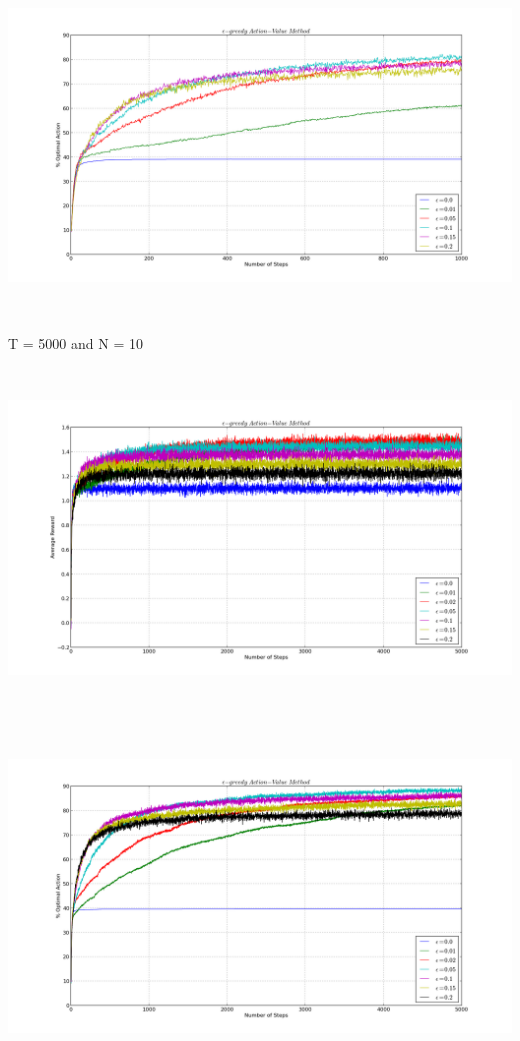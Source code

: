 \documentclass[a4paper,10pt]{report}
\newenvironment{my_itemize}{
\begin{itemize}
  \setlength{\itemsep}{1pt}
  \setlength{\parskip}{0pt}
  \setlength{\parsep}{0pt}}{
\end{itemize}}
\begin{document}
\begin{my_itemize}
\begin{center}
\end{center}
\begin{center}
\centerline{\includegraphics*[width=180mm, height=90mm]{EpsOpt-10-1000.png}}
\end{center}
\pagebreak
\item T = 5000 and N = 10
\begin{center}
\centerline{\includegraphics*[width=180mm, height=90mm]{EpsRew-10-5000.png}}
\end{center}
\begin{center}
\centerline{\includegraphics*[width=180mm, height=90mm]{EpsOpt-10-5000.png}}

\end{center}
\end{my_itemize}
\end{document}
